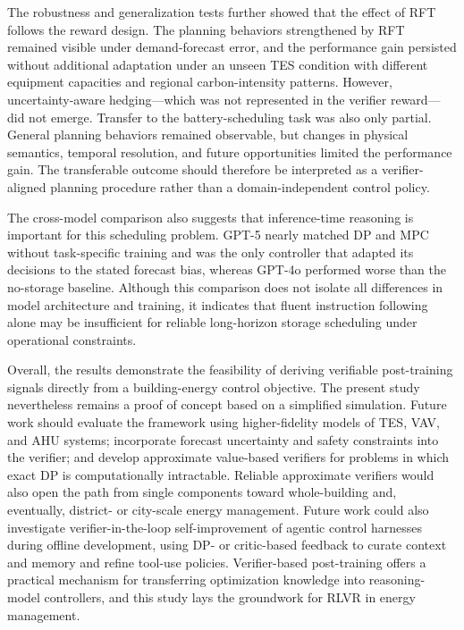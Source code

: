 \documentclass[11pt]{article}
\begin{document}
The robustness and generalization tests further showed that the effect of RFT follows the reward design. The planning behaviors strengthened by RFT remained visible under demand-forecast error, and the performance gain persisted without additional adaptation under an unseen TES condition with different equipment capacities and regional carbon-intensity patterns. However, uncertainty-aware hedging---which was not represented in the verifier reward---did not emerge. Transfer to the battery-scheduling task was also only partial. General planning behaviors remained observable, but changes in physical semantics, temporal resolution, and future opportunities limited the performance gain. The transferable outcome should therefore be interpreted as a verifier-aligned planning procedure rather than a domain-independent control policy.

The cross-model comparison also suggests that inference-time reasoning is important for this scheduling problem. GPT-5 nearly matched DP and MPC without task-specific training and was the only controller that adapted its decisions to the stated forecast bias, whereas GPT-4o performed worse than the no-storage baseline. Although this comparison does not isolate all differences in model architecture and training, it indicates that fluent instruction following alone may be insufficient for reliable long-horizon storage scheduling under operational constraints.

Overall, the results demonstrate the feasibility of deriving verifiable post-training signals directly from a building-energy control objective. The present study nevertheless remains a proof of concept based on a simplified simulation. Future work should evaluate the framework using higher-fidelity models of TES, VAV, and AHU systems; incorporate forecast uncertainty and safety constraints into the verifier; and develop approximate value-based verifiers for problems in which exact DP is computationally intractable. Reliable approximate verifiers would also open the path from single components toward whole-building and, eventually, district- or city-scale energy management. Future work could also investigate verifier-in-the-loop self-improvement of agentic control harnesses during offline development, using DP- or critic-based feedback to curate context and memory and refine tool-use policies. Verifier-based post-training offers a practical mechanism for transferring optimization knowledge into reasoning-model controllers, and this study lays the groundwork for RLVR in energy management.
\end{document}
